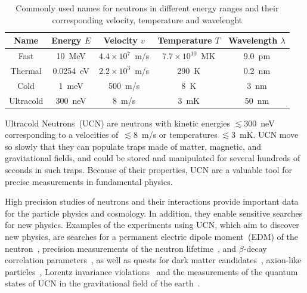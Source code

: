 \begin{table}
  \label{tab:ucnenergy}
  \centering
  \begin{tabular}{|c|c|c|c|c|}
    \hline
    Name & Energy $E$ & Velocity $v$ & Temperature $T$ & Wavelength $\lambda$ \\
    \hline
    \hline
    Fast & 10~MeV & $4.4 \times 10^7$~m/s & $7.7 \times 10^{10}$~MK & 9.0~pm \\
    \hline
    Thermal & 0.0254~eV & $ 2.2 \times 10^3$~m/s & 290~K & 0.2~nm \\
    \hline
    Cold & 1~meV & 500~m/s & 8~K & 3~nm \\
    \hline
    Ultracold & 300~neV & 8~m/s & 3~mK & 50~nm \\
    \hline
  \end{tabular}
  \caption{Commonly used names for neutrons in different energy ranges
    and their corresponding velocity, temperature and wavelenght}
\end{table}



Ultracold Neutrons~(UCN) are neutrons with kinetic energies
$\lesssim 300$~neV corresponding to a velocities of~$\lesssim 8$~m/s or
temperatures $\lesssim 3$~mK. UCN move so slowly that they can
populate traps made of matter, magnetic, and gravitational fields, and
could be stored and manipulated for several hundreds of seconds in such
traps. Because of their properties, UCN are a valuable tool for precise
measurements in fundamental physics.

High precision studies of neutrons and their interactions provide
important data for the particle physics and cosmology. In addition,
they enable sensitive searches for new physics. Examples of the
experiments using UCN, which aim to discover new physics, are searches
for a permanent electric dipole moment~(EDM) of the
neutron~\cite{Baker2006,Serebrov2009,Lam_Gol,Altarev2010,Pendlebury2015},
precision measurements of the neutron
lifetime~\cite{Paul2009,Wietfeldt2011,Arzumanov2000,Serebrov2005,Huffman},
and $\beta$-decay correlation parameters~\cite{Mendenhall,Broussard},
as well as quests for dark matter
candidates~\cite{Serebrov2008,Zimmer2010}, axion-like
particles~\cite{Baessler,Serebrov2010,Afach2015}, Lorentz
invariance violations~\cite{Altarev2009} and the measurements of the
quantum states of UCN in the gravitational field of the
earth~\cite{Nesvizhevsky2003}.

